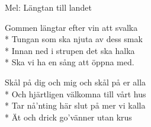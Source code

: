 \begin{SongText}
    \begin{SongInfo}
        Mel: Längtan till landet
    \end{SongInfo}
    \begin{SongVerse}
        Gommen längtar efter vin att svalka\\*%
        Tungan som ska njuta av dess smak\\*%
        Innan ned i strupen det ska halka\\*%
        Ska vi ha en sång att öppna med.
    \end{SongVerse}
    \begin{SongVerse}
        Skål på dig och mig och skål på er alla\\*%
        Och hjärtligen välkomna till vårt hus\\*%
        Tar nå’nting här slut på mer vi kalla\\*%
        Ät och drick go’vänner utan krus
    \end{SongVerse}
\end{SongText}
